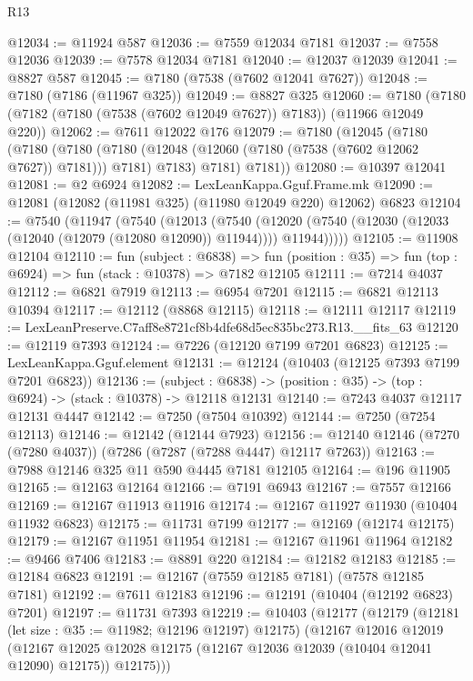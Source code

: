 \begin{lexlean}{R13}
\begin{coremodule}
@12034 := @11924 @587
@12036 := @7559 @12034 @7181
@12037 := @7558 @12036
@12039 := @7578 @12034 @7181
@12040 := @12037 @12039
@12041 := @8827 @587
@12045 := @7180 (@7538 (@7602 @12041 @7627))
@12048 := @7180 (@7186 (@11967 @325))
@12049 := @8827 @325
@12060 := @7180 (@7180 (@7182 (@7180 (@7538 (@7602 @12049 @7627)) @7183)) (@11966 @12049 @220))
@12062 := @7611 @12022 @176
@12079 := @7180
    (@12045
      (@7180
        (@7180
          (@7180 (@7180 (@12048 (@12060 (@7180 (@7538 (@7602 @12062 @7627)) @7181))) @7181) @7183)
          @7181)
        @7181))
@12080 := @10397 @12041
@12081 := @2 @6924
@12082 := LexLeanKappa.Gguf.Frame.mk
@12090 := @12081 (@12082 (@11981 @325) (@11980 @12049 @220) @12062) @6823
@12104 := @7540
    (@11947
      (@7540
        (@12013
          (@7540
            (@12020 (@7540 (@12030 (@12033 (@12040 (@12079 (@12080 @12090)) @11944)))) @11944)))))
@12105 := @11908 @12104
@12110 := fun (subject : @6838) =>
  fun (position : @35) => fun (top : @6924) => fun (stack : @10378) => @7182 @12105
@12111 := @7214 @4037
@12112 := @6821 @7919
@12113 := @6954 @7201
@12115 := @6821 @12113 @10394
@12117 := @12112 (@8868 @12115)
@12118 := @12111 @12117
@12119 := LexLeanPreserve.C7aff8e8721cf8b4dfe68d5ec835bc273.R13.__fits_63
@12120 := @12119 @7393
@12124 := @7226 (@12120 @7199 @7201 @6823)
@12125 := LexLeanKappa.Gguf.element
@12131 := @12124 (@10403 (@12125 @7393 @7199 @7201 @6823))
@12136 := (subject : @6838) ->
  (position : @35) -> (top : @6924) -> (stack : @10378) -> @12118 @12131
@12140 := @7243 @4037 @12117 @12131 @4447
@12142 := @7250 (@7504 @10392)
@12144 := @7250 (@7254 @12113)
@12146 := @12142 (@12144 @7923)
@12156 := @12140 @12146 (@7270 (@7280 @4037)) (@7286 (@7287 (@7288 @4447) @12117 @7263))
@12163 := @7988 @12146 @325 @11 @590 @4445 @7181 @12105
@12164 := @196 @11905
@12165 := @12163 @12164
@12166 := @7191 @6943
@12167 := @7557 @12166
@12169 := @12167 @11913 @11916
@12174 := @12167 @11927 @11930 (@10404 @11932 @6823)
@12175 := @11731 @7199
@12177 := @12169 (@12174 @12175)
@12179 := @12167 @11951 @11954
@12181 := @12167 @11961 @11964
@12182 := @9466 @7406
@12183 := @8891 @220
@12184 := @12182 @12183
@12185 := @12184 @6823
@12191 := @12167 (@7559 @12185 @7181) (@7578 @12185 @7181)
@12192 := @7611 @12183
@12196 := @12191 (@10404 (@12192 @6823) @7201)
@12197 := @11731 @7393
@12219 := @10403
    (@12177
      (@12179
        (@12181 (let size : @35 := @11982; @12196 @12197) @12175)
        (@12167
          @12016
          @12019
          (@12167 @12025 @12028 @12175 (@12167 @12036 @12039 (@10404 @12041 @12090) @12175))
          @12175)))

\end{coremodule}
\end{lexlean}
